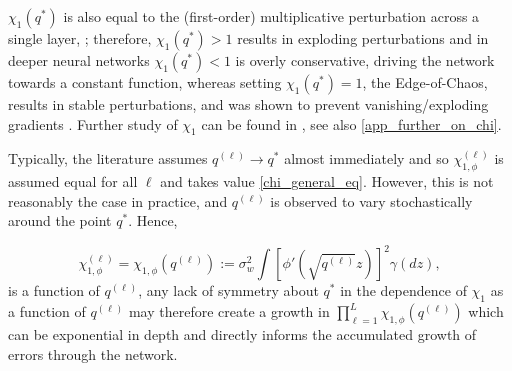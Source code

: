 \documentclass{article}
\theoremstyle{plain}
\theoremstyle{definition}
\theoremstyle{remark}
\begin{document}
$\chi_1(q^*)$ is also equal to the (first-order) multiplicative perturbation across a single layer, \cite{poole_exponential_2016}; therefore, $\chi_1(q^*) > 1$ results in exploding perturbations and in deeper neural networks $\chi_1(q^*) < 1$ is overly conservative, driving the network towards a constant function, whereas setting $\chi_1(q^*) = 1$, the Edge-of-Chaos, results in stable perturbations, and was shown to prevent vanishing/exploding gradients \cite{schoenholz_deep_2017}. Further study of $\chi_1$ can be found in \cite{poole_exponential_2016, schoenholz_deep_2017, xiao_dynamical_2018}, see also \cref{app_further_on_chi}.

Typically, the literature assumes $q^{(\ell)} \rightarrow q^*$ almost immediately and so $\chi_{1, \phi}^{(\ell)}$ is assumed equal for all $\ell$ and takes value \eqref{chi_general_eq}. However, this is not reasonably the case in practice, and $q^{(\ell)}$ is observed to vary stochastically around the point $q^*$. Hence,

\begin{equation}
    \chi_{1, \phi}^{(\ell)} ={\chi}_{1, \phi}\left(q^{(\ell)}\right) := \sigma_w^2 \int \left[ \phi' \left( \sqrt{{q}^{(\ell)}}z \right) \right]^2 \gamma \left(dz \right),
\end{equation}
is a function of $q^{(\ell)}$, any lack of symmetry about $q^*$ in the dependence of $\chi_1$ as a function of $q^{(\ell)}$ may therefore create a growth in $\prod_{\ell=1}^L {\chi}_{1, \phi}\left(q^{(\ell)}\right)$ which can be exponential in depth and directly informs the accumulated growth of errors through the network. 
\end{document}
